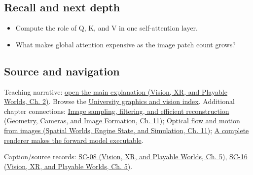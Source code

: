 \subsection{Recall and next depth}\label{appendix-a9d5dfdd164a-recall-and-next-depth}

\begin{itemize}
\tightlist
\item
  Compute the role of Q, K, and V in one self-attention layer.
\item
  What makes global attention expensive as the image patch count grows?
\end{itemize}

\subsection{Source and navigation}\label{appendix-a9d5dfdd164a-source-and-navigation}

Teaching narrative: \href{../07-Vision-XR-and-Playable-Worlds/main.pdf\#nameddest=04-visual-computing-ii-ch031-sequence-models-and-attention}{open the main explanation (Vision, XR, and Playable Worlds, Ch. 2)}. Browse the \hyperref[appendix-a6d556a4ef50-university-graphics-vision-and-photography---independent-series]{University graphics and vision index}. Additional chapter connections: \href{../03-Geometry-Cameras-and-Image-Formation/main.pdf\#nameddest=03-visual-computing-i-ch004-image-sampling-filtering-and-efficient-reconstruction}{Image sampling, filtering, and efficient reconstruction (Geometry, Cameras, and Image Formation, Ch. 11)}; \href{../05-Spatial-Worlds-Engine-State-and-Simulation/main.pdf\#nameddest=04-visual-computing-ii-ch030-optical-flow-and-motion-from-images}{Optical flow and motion from images (Spatial Worlds, Engine State, and Simulation, Ch. 11)}; \hyperref[04-visual-computing-ii-ch035-a-complete-renderer-makes-the-forward-model-executable]{A complete renderer makes the forward model executable}.

Caption/source records: \href{../07-Vision-XR-and-Playable-Worlds/main.pdf\#nameddest=04-visual-computing-ii-ch036-sc-08---stanford-cs231n-spring-2025-lecture-8-attention-and-transformers}{SC-08 (Vision, XR, and Playable Worlds, Ch. 5)}, \href{../07-Vision-XR-and-Playable-Worlds/main.pdf\#nameddest=04-visual-computing-ii-ch036-sc-16---stanford-cs231n-deep-learning-for-computer-vision-spring-2025-lecture-16-vision-and-language}{SC-16 (Vision, XR, and Playable Worlds, Ch. 5)}.
